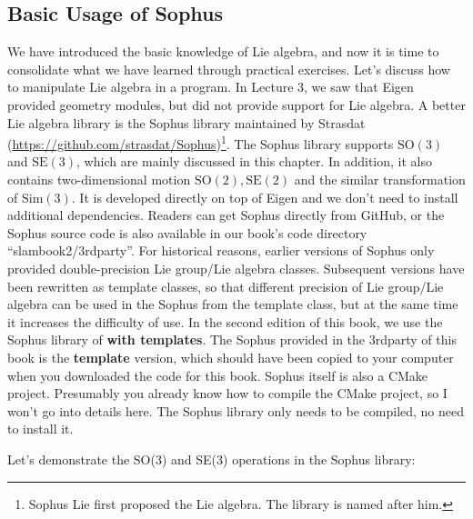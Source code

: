 \subsection{Basic Usage of Sophus}
We have introduced the basic knowledge of Lie algebra, and now it is time to consolidate what we have learned through practical exercises. Let's discuss how to manipulate Lie algebra in a program. In Lecture 3, we saw that Eigen provided geometry modules, but did not provide support for Lie algebra. A better Lie algebra library is the Sophus library maintained by Strasdat (\url{https://github.com/strasdat/Sophus})\footnote{Sophus Lie first proposed the Lie algebra. The library is named after him.}. The Sophus library supports $\mathrm{SO}(3)$ and $\mathrm{SE}(3)$, which are mainly discussed in this chapter. In addition, it also contains two-dimensional motion $\mathrm{SO}(2), \mathrm{SE} (2) $ and the similar transformation of $\mathrm{Sim}(3)$. It is developed directly on top of Eigen and we don't need to install additional dependencies. Readers can get Sophus directly from GitHub, or the Sophus source code is also available in our book's code directory ``slambook2/3rdparty''. For historical reasons, earlier versions of Sophus only provided double-precision Lie group/Lie algebra classes. Subsequent versions have been rewritten as template classes, so that different precision of Lie group/Lie algebra can be used in the Sophus from the template class, but at the same time it increases the difficulty of use. In the second edition of this book, we use the Sophus library of \textbf{with templates}. The Sophus provided in the 3rdparty of this book is the \textbf{template} version, which should have been copied to your computer when you downloaded the code for this book. Sophus itself is also a CMake project. Presumably you already know how to compile the CMake project, so I won't go into details here. The Sophus library only needs to be compiled, no need to install it.

Let's demonstrate the SO(3) and SE(3) operations in the Sophus library:

